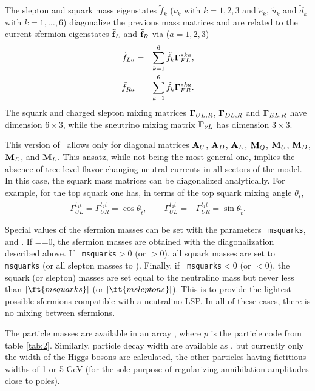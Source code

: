 The slepton and squark mass eigenstates $\tilde{f}_k$ ($\tilde{\nu}_k$
with $k=1,2,3$ and $\tilde{e}_k$, $\tilde{u}_k$ and $\tilde{d}_k$ with
$k=1,\dots,6$) diagonalize the previous mass matrices and are related
to the current sfermion eigenstates ${\bf \tilde{f}}_{L}$ and ${\bf
\tilde{f}}_{R}$ via ($a=1,2,3$)
\begin{eqnarray}
  \tilde{f}_{La} & = & \sum_{k=1}^6 \tilde{f}_k {\bf \Gamma}_{FL}^{*ka} , \\
  \tilde{f}_{Ra} & = & \sum_{k=1}^6 \tilde{f}_k {\bf \Gamma}_{FR}^{*ka} .
\end{eqnarray} 
The squark and charged slepton mixing matrices ${\bf \Gamma}_{UL,R}$,
${\bf \Gamma}_{DL,R}$ and ${\bf \Gamma}_{EL,R}$ have dimension
$6\times 3$, while the sneutrino mixing matrix ${\bf \Gamma}_{\nu L}$
has dimension $3\times3$.

This version of \ds\ allows only for diagonal matrices ${\bf A}_U$,
${\bf A}_D$, ${\bf A}_E$, ${\bf M}_Q$, ${\bf M}_U$, ${\bf M}_D$, ${\bf M}_E$,
and ${\bf M}_L$. This ansatz, while not being the most general one, implies the
absence of tree-level flavor changing neutral currents in all sectors of the
model. In this case, the squark mass matrices can be diagonalized analytically.
For example, for the top squark one has, in terms of the top squark mixing
angle $\theta_{\tilde{t}}$,
\begin{equation}
  \Gamma_{UL}^{\tilde{t}_1\tilde{t}} =
  \Gamma_{UR}^{\tilde{t}_2\tilde{t}} = \cos \theta_{\tilde{t}} ,
  \qquad
  \Gamma_{UL}^{\tilde{t}_2\tilde{t}} =
  - \Gamma_{UR}^{\tilde{t}_1\tilde{t}} = \sin \theta_{\tilde{t}} .
\end{equation}

Special values of the sfermion masses can be set with the parameters {\tt
  msquarks}, and .  If ==0, the
sfermion masses are obtained with the diagonalization described above. If {\tt
  msquarks}$>$0 (or $>$0), all squark masses are set to {\tt
  msquarks} (or all slepton masses to ).  Finally, if {\tt
  msquarks}$<$0 (or $<$0), the squark (or slepton) masses are
set equal to the neutralino mass but never less than $|\ft{msquarks}|$ (or
$|\ft{msleptons}|$).  This is to provide the lightest possible sfermions
compatible with a neutralino LSP. In all of these cases, there is no mixing
  between sfermions.


The particle masses are available in an array , where $p$ is the
particle code from table \ref{tab:2}. Similarly, particle decay width are
available as , but currently only the width of the Higgs bosons
are calculated, the other particles having fictitious widths of 1 or 5 GeV (for
the sole purpose of regularizing annihilation amplitudes close to poles).

